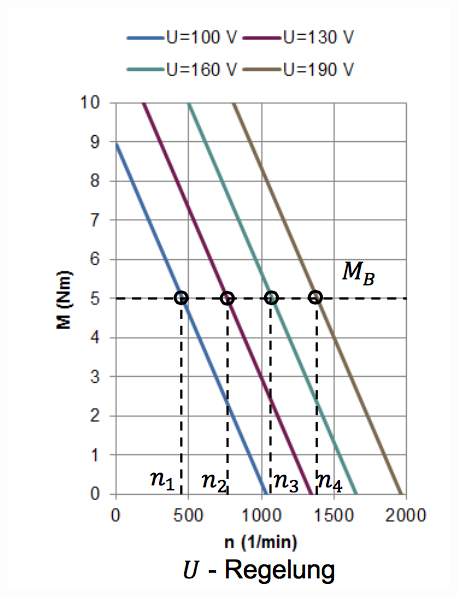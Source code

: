 \begin{minipage}{0.3 \linewidth}
\includegraphics[width = \linewidth]{./Pics/VL45/Drehzahlregelung2}
\end{minipage}
